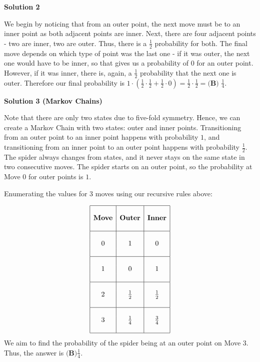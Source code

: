 \begin{enumerate}
 



\textbf{Solution 2}

We begin by noticing that from an outer point, the next move must be to an inner point as both adjacent points are inner. Next, there are four adjacent points - two are inner, two are outer. Thus, there is a $\frac{1}{2}$ probability for both. The final move depends on which type of point was the last one - if it was outer, the next one would have to be inner, so that gives us a probability of $0$ for an outer point. However, if it was inner, there is, again, a $\frac{1}{2}$ probability that the next one is outer. Therefore our final probability is $1 \cdot (\frac{1}{2} \cdot \frac{1}{2} + \frac{1}{2} \cdot 0) = \frac{1}{2} \cdot \frac{1}{2} = \boxed{\textbf{(B) } \frac{1}{4}}$.

 



\textbf{Solution 3 (Markov Chains)}

Note that there are only two states due to five-fold symmetry. Hence, we can create a Markov Chain with two states: outer and inner points. Transitioning from an outer point to an inner point happens with probability $1$, and transitioning from an inner point to an outer point happens with probability $\frac{1}{2}$. The spider always changes from states, and it never stays on the same state in two consecutive moves. The spider starts on an outer point, so the probability at Move 0 for outer points is $1$.

 Enumerating the values for 3 moves using our recursive rules above:

 
 \[\begin{array}{|c|c|c|c|} \hline &&\\ \textbf{Move} & \textbf{Outer} & \textbf{Inner}\\ &&\\ \hline &&\\ 0 & 1 & 0\\ &&\\ \hline &&\\ 1 & 0 & 1\\ &&\\ \hline &&\\ 2 & \frac{1}{2} & \frac{1}{2}\\ &&\\ \hline &&\\ 3 & \frac{1}{4} & \frac{3}{4}\\ &&\\ \hline \end{array}\]We aim to find the probability of the spider being at an outer point on Move 3. Thus, the answer is $\boxed{\textbf{(B)} \frac{1}{4}}$.


\end{enumerate}

